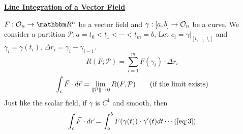 \documentclass[../Analysis-3]{subfiles}
\begin{document}
\begin{center}
    \large \underline{\textbf{Line Integration of a Vector Field} }
\end{center}

$F:\Op{n} \to \R^n$ be a vector field and $\gamma:[a,b] \to \mathcal{O}_{n}$ be a curve. We consider a partition $\mathcal{P}: a =t_0<t_1<\cdots < t_m=b$, Let $c_i = \gamma|_{[t_{i-1},t_i]}$ and $\gamma_i = \gamma(t_i)$, $\Delta r_i = \gamma_{i} - \gamma_{i-1}$.
\[R(F;\mathcal{P})= \sum_{i=1}^m F(\gamma_i)\cdot \Delta r_i\]
\begin{align*}
    \int_c \vec{F}\cdot d\vec{r} = \lim_{\norm{\mathcal{P}}\to 0} R(F,\mathcal{P}) \tag{if the limit exists}
\end{align*}
Just like the scalar field, if $\gamma$ is $C^1$ and smooth, then
\[\int_c \vec{F}\cdot d\vec{r} = \int_a^b F(\gamma(t))\cdot \gamma'(t) dt \label{eq:3} \cdots (\ref{eq:3})\]
\end{document}
